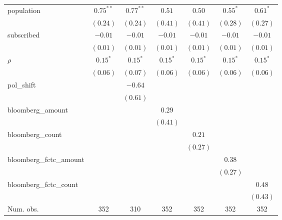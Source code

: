 \begin{table}[!h]
\begin{center}
\begin{tabular}{l c c c c c c }
population              & $0.75^{**}$  & $0.77^{**}$  & $0.51$       & $0.50$       & $0.55^{*}$   & $0.61^{*}$   \\
                        & $(0.24)$     & $(0.24)$     & $(0.41)$     & $(0.41)$     & $(0.28)$     & $(0.27)$     \\
subscribed              & $-0.01$      & $-0.01$      & $-0.01$      & $-0.01$      & $-0.01$      & $-0.01$      \\
                        & $(0.01)$     & $(0.01)$     & $(0.01)$     & $(0.01)$     & $(0.01)$     & $(0.01)$     \\
$\rho$                  & $0.15^{*}$   & $0.15^{*}$   & $0.15^{*}$   & $0.15^{*}$   & $0.15^{*}$   & $0.15^{*}$   \\
                        & $(0.06)$     & $(0.07)$     & $(0.06)$     & $(0.06)$     & $(0.06)$     & $(0.06)$     \\
pol\_shift              &              & $-0.64$      &              &              &              &              \\
                        &              & $(0.61)$     &              &              &              &              \\
bloomberg\_amount       &              &              & $0.29$       &              &              &              \\
                        &              &              & $(0.41)$     &              &              &              \\
bloomberg\_count        &              &              &              & $0.21$       &              &              \\
                        &              &              &              & $(0.27)$     &              &              \\
bloomberg\_fctc\_amount &              &              &              &              & $0.38$       &              \\
                        &              &              &              &              & $(0.27)$     &              \\
bloomberg\_fctc\_count  &              &              &              &              &              & $0.48$       \\
                        &              &              &              &              &              & $(0.43)$     \\
\midrule
Num. obs.               & 352          & 310          & 352          & 352          & 352          & 352          \\

\end{tabular}
\end{center}
\end{table}
